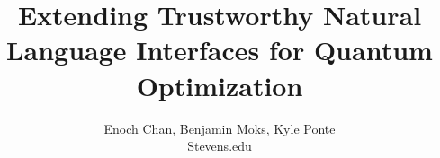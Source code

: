 %

\begin{titlepage}
        \title{Extending Trustworthy Natural Language Interfaces for Quantum Optimization 
}
        \author{Enoch Chan, Benjamin Moks, Kyle Ponte \\ Stevens.edu }
        \conferraldate{}{\today} \maketitle
\end{titlepage}

\makecopyright

\begin{abstract}
\end{abstract}


% 


\contentspage

\tablelistpage

\figurelistpage